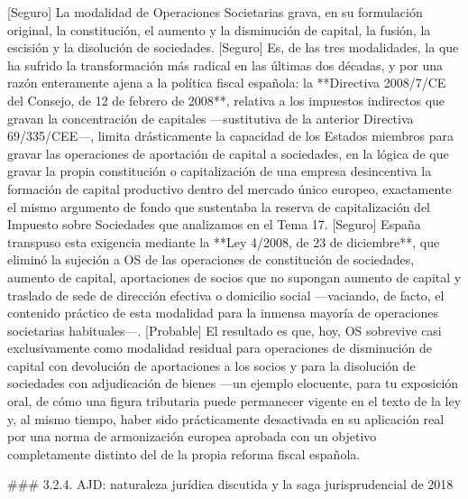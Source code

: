 \documentclass[10pt,a4paper]{article}
\begin{document}
[Seguro] La modalidad de Operaciones Societarias grava, en su formulación original, la constitución, el aumento y la disminución de capital, la fusión, la escisión y la disolución de sociedades. [Seguro] Es, de las tres modalidades, la que ha sufrido la transformación más radical en las últimas dos décadas, y por una razón enteramente ajena a la política fiscal española: la **Directiva 2008/7/CE del Consejo, de 12 de febrero de 2008**, relativa a los impuestos indirectos que gravan la concentración de capitales —sustitutiva de la anterior Directiva 69/335/CEE—, limita drásticamente la capacidad de los Estados miembros para gravar las operaciones de aportación de capital a sociedades, en la lógica de que gravar la propia constitución o capitalización de una empresa desincentiva la formación de capital productivo dentro del mercado único europeo, exactamente el mismo argumento de fondo que sustentaba la reserva de capitalización del Impuesto sobre Sociedades que analizamos en el Tema 17. [Seguro] España transpuso esta exigencia mediante la **Ley 4/2008, de 23 de diciembre**, que eliminó la sujeción a OS de las operaciones de constitución de sociedades, aumento de capital, aportaciones de socios que no supongan aumento de capital y traslado de sede de dirección efectiva o domicilio social —vaciando, de facto, el contenido práctico de esta modalidad para la inmensa mayoría de operaciones societarias habituales—. [Probable] El resultado es que, hoy, OS sobrevive casi exclusivamente como modalidad residual para operaciones de disminución de capital con devolución de aportaciones a los socios y para la disolución de sociedades con adjudicación de bienes —un ejemplo elocuente, para tu exposición oral, de cómo una figura tributaria puede permanecer vigente en el texto de la ley y, al mismo tiempo, haber sido prácticamente desactivada en su aplicación real por una norma de armonización europea aprobada con un objetivo completamente distinto del de la propia reforma fiscal española.

### 3.2.4. AJD: naturaleza jurídica discutida y la saga jurisprudencial de 2018
\end{document}
